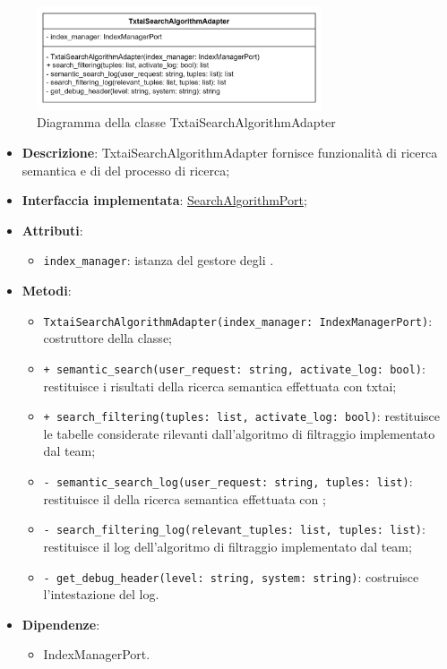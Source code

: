  \label{TxtaiSearchAlgorithmAdapter}
\begin{figure}[H]
    \centering
    \includegraphics[width=0.75\textwidth]{assets/Backend/txtai_search_algorithm_adapter.png}
    \caption{Diagramma della classe TxtaiSearchAlgorithmAdapter}
  \end{figure}
\begin{itemize}
    \item \textbf{Descrizione}: TxtaiSearchAlgorithmAdapter fornisce funzionalità di ricerca semantica e di  del processo di ricerca;
    \item \textbf{Interfaccia implementata}: \hyperref[SearchAlgorithmPort]{SearchAlgorithmPort};
    \item \textbf{Attributi}:
    \begin{itemize}
        \item \texttt{index\_manager}: istanza del gestore degli .
    \end{itemize}
    \item \textbf{Metodi}:
    \begin{itemize}
        \item \texttt{TxtaiSearchAlgorithmAdapter(index\_manager: IndexManagerPort)}: costruttore della classe;
        \item \texttt{+ semantic\_search(user\_request: string, activate\_log: bool)}: restituisce i risultati della ricerca semantica effettuata con txtai;
        \item \texttt{+ search\_filtering(tuples: list, activate\_log: bool)}: restituisce le tabelle considerate rilevanti dall'algoritmo di filtraggio implementato dal team;
        \item \texttt{- semantic\_search\_log(user\_request: string, tuples: list)}: restituisce il  della ricerca semantica effettuata con ;
        \item \texttt{- search\_filtering\_log(relevant\_tuples: list, tuples: list)}: restituisce il log dell'algoritmo di filtraggio implementato dal team;
        \item \texttt{- get\_debug\_header(level: string, system: string)}: costruisce l'intestazione del log.
    \end{itemize}
    \item \textbf{Dipendenze}:
    \begin{itemize}
        \item IndexManagerPort.
    \end{itemize}
\end{itemize} 

